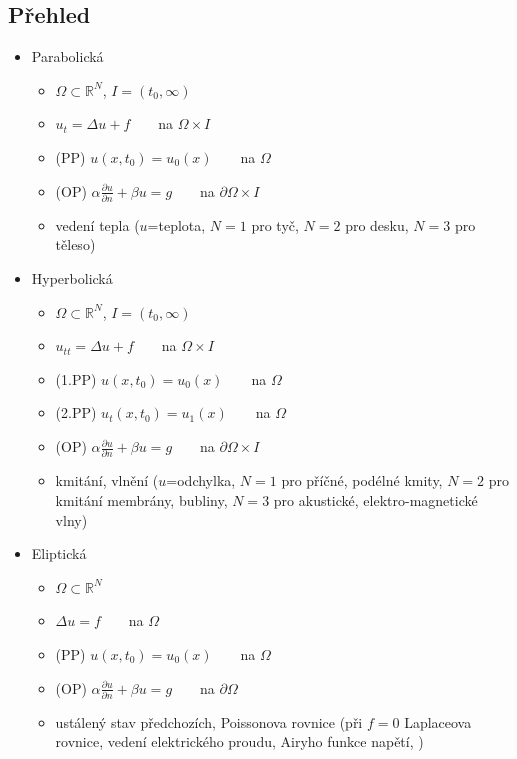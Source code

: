 \documentclass[a4]{report}
\theoremstyle{definition}
\begin{document}
\subsection{Přehled}
\begin{itemize}
    \item Parabolická
        \begin{itemize}
            \item $\Omega \subset \mathbb{R}^N$, $I=(t_0,\infty)$
            \item $u_t=\Delta u +f$\ \ \ \ na $\Omega\times I$
            \item (PP) $u(x,t_0)=u_0(x)$\ \ \ \ na $\Omega$
            \item (OP) $\alpha \frac{\partial u}{\partial n} +\beta u=g$\ \ \ \ na $\partial\Omega\times I$
            \item vedení tepla ($u$=teplota, $N=1$ pro tyč, $N=2$ pro desku, $N=3$ pro těleso)
        \end{itemize}
    \item Hyperbolická
        \begin{itemize}
            \item $\Omega \subset \mathbb{R}^N$, $I=(t_0,\infty)$
            \item $u_{tt}=\Delta u +f$\ \ \ \ na $\Omega\times I$
            \item (1.PP) $u(x,t_0)=u_0(x)$\ \ \ \ na $\Omega$
            \item (2.PP) $u_t(x,t_0)=u_1(x)$\ \ \ \ na $\Omega$
            \item (OP) $\alpha \frac{\partial u}{\partial n} +\beta u=g$\ \ \ \ na $\partial\Omega\times I$
            \item kmitání, vlnění ($u$=odchylka, $N=1$ pro příčné, podélné kmity, $N=2$ pro kmitání membrány, bubliny, $N=3$ pro akustické, elektro-magnetické vlny)
        \end{itemize}    
    \item Eliptická
        \begin{itemize}
            \item $\Omega \subset \mathbb{R}^N$
            \item $\Delta u=f$\ \ \ \ na $\Omega$
            \item (PP) $u(x,t_0)=u_0(x)$\ \ \ \ na $\Omega$
            \item (OP) $\alpha \frac{\partial u}{\partial n} +\beta u=g$\ \ \ \ na $\partial\Omega$
            \item ustálený stav předchozích, Poissonova rovnice (při $f=0$ Laplaceova rovnice, vedení elektrického proudu, Airyho funkce napětí,   )
        \end{itemize}  
\end{itemize}
\end{document}
